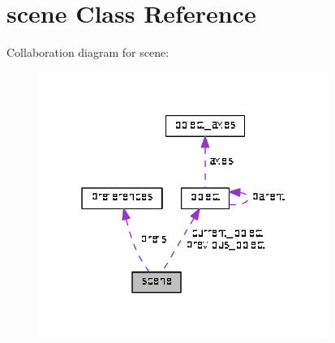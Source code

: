 \hypertarget{classscene}{}\section{scene Class Reference}
\label{classscene}


Collaboration diagram for scene\+:\nopagebreak
\begin{figure}[H]
\begin{center}
\leavevmode
\includegraphics[width=268pt]{classscene__coll__graph}
\end{center}
\end{figure}

